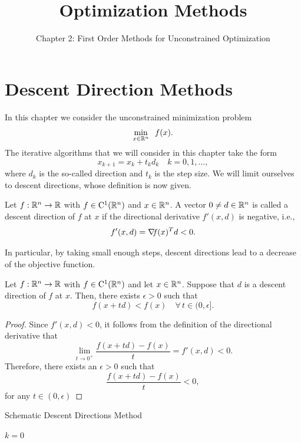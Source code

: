 \documentclass[10pt,a4paper]{article}
\title{Optimization Methods}
\author{Chapter 2: First Order Methods for Unconstrained Optimization}
\date{}
\begin{document}
	\maketitle
	\section{Descent Direction Methods}
	\noindent In this chapter we consider the unconstrained minimization problem
	\begin{equation*}
		\min_{x\in\mathbb{R}^n} \;\; f(x).
	\end{equation*}
The iterative algorithms that we will consider in this chapter take the form
\begin{equation*}
	x_{k+1} = x_k +t_k d_k \quad k=0,1, \dots,
\end{equation*}
where $d_k$ is the so-called direction and $t_k$ is the step size. We will limit ourselves to descent
directions, whose definition is now given.
\begin{definition}
	Let $f:\mathbb{R}^n\to\mathbb{R}$ with $f\in\mathord{\mathrm{C^1}}(\mathbb{R}^n)$ and $x\in \mathbb{R}^n$. A vector $0\neq d\in \mathbb{R}^n$ is called a descent direction of $f$ at $x$ if the directional derivative $f'(x,d)$ is negative, i.e., 
	\begin{equation*}
		f'(x,d)= \operatorname*{\mathit{\nabla \!f}}(x)^T d < 0.
	\end{equation*}
\end{definition}
\noindent In particular, by taking small enough steps, descent directions lead to a decrease of the objective function.
\begin{lemma}
	Let $f:\mathbb{R}^n\to\mathbb{R}$ with $f\in\mathord{\mathrm{C^1}}(\mathbb{R}^n)$ and let $x\in \mathbb{R}^n$. Suppose that $d$ is a descent direction of $f$ at $x$. Then, there exists $\epsilon>0$ such that 
	\begin{equation*}
		f(x+td) < f(x) \quad \forall \, t \in (0,\epsilon].
	\end{equation*} 
\end{lemma}
\begin{proof}
	Since $f'(x,d)<0$, it follows from the definition of the directional derivative that 
	\begin{equation*}
		\lim_{t\to 0^+}\frac{f(x+td)-f(x)}{t} = f'(x,d) <0.
	\end{equation*}
Therefore, there exists an $\epsilon>0$ such that 
\begin{equation*}
	\frac{f(x+td)-f(x)}{t}<0,
\end{equation*}
for any $t\in(0,\epsilon)$
\end{proof}
\begin{algorithm}[H]\label{alg}
	\caption{Schematic Descent Directions Method}
	
	
	$k = 0$
	
\end{algorithm}
\end{document}
